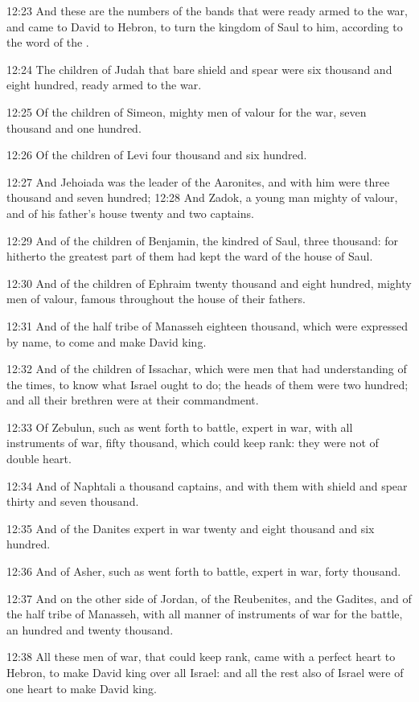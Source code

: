12:23 And these are the numbers of the bands that were ready armed to the war, and came to David to Hebron, to turn the kingdom of Saul to him, according to the word of the \LORD.

12:24 The children of Judah that bare shield and spear were six thousand and eight hundred, ready armed to the war.

12:25 Of the children of Simeon, mighty men of valour for the war, seven thousand and one hundred.

12:26 Of the children of Levi four thousand and six hundred.

12:27 And Jehoiada was the leader of the Aaronites, and with him were three thousand and seven hundred; 12:28 And Zadok, a young man mighty of valour, and of his father's house twenty and two captains.

12:29 And of the children of Benjamin, the kindred of Saul, three thousand: for hitherto the greatest part of them had kept the ward of the house of Saul.

12:30 And of the children of Ephraim twenty thousand and eight hundred, mighty men of valour, famous throughout the house of their fathers.

12:31 And of the half tribe of Manasseh eighteen thousand, which were expressed by name, to come and make David king.

12:32 And of the children of Issachar, which were men that had understanding of the times, to know what Israel ought to do; the heads of them were two hundred; and all their brethren were at their commandment.

12:33 Of Zebulun, such as went forth to battle, expert in war, with all instruments of war, fifty thousand, which could keep rank: they were not of double heart.

12:34 And of Naphtali a thousand captains, and with them with shield and spear thirty and seven thousand.

12:35 And of the Danites expert in war twenty and eight thousand and six hundred.

12:36 And of Asher, such as went forth to battle, expert in war, forty thousand.

12:37 And on the other side of Jordan, of the Reubenites, and the Gadites, and of the half tribe of Manasseh, with all manner of instruments of war for the battle, an hundred and twenty thousand.

12:38 All these men of war, that could keep rank, came with a perfect heart to Hebron, to make David king over all Israel: and all the rest also of Israel were of one heart to make David king.

